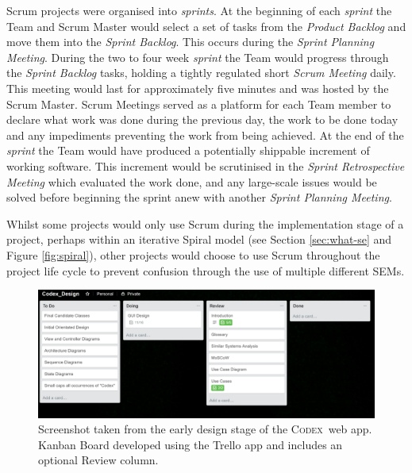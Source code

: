 \documentclass[final]{cmpreport}
\newcommand{\Codex}{\textsc{Codex}}
\begin{document}
			Scrum projects were organised into \emph{sprints}. At the beginning of each \emph{sprint} the Team and Scrum Master would select a set of tasks from the \emph{Product Backlog} and move them into the \emph{Sprint Backlog}. This occurs during the \emph{Sprint Planning Meeting}. During the two to four week \emph{sprint} the Team would progress through the \emph{Sprint Backlog} tasks, holding a tightly regulated short \emph{Scrum Meeting} daily. This meeting would last for approximately five minutes and was hosted by the Scrum Master. Scrum Meetings served as a platform for each Team member to declare what work was done during the previous day, the work to be done today and any impediments preventing the work from being achieved. At the end of the \emph{sprint} the Team would have produced a potentially shippable increment of working software. This increment would be scrutinised in the \emph{Sprint Retrospective Meeting} which evaluated the work done, and any large-scale issues would be solved before beginning the sprint anew with another \emph{Sprint Planning Meeting}.
			
			Whilst some projects would only use Scrum during the implementation stage of a project, perhaps within an iterative Spiral model (see Section \ref{sec:what-se} and Figure \ref{fig:spiral}), other projects would choose to use Scrum throughout the project life cycle to prevent confusion through the use of multiple different SEMs. 
			
			\begin{figure}
				\centering
				\includegraphics[width=0.8\linewidth]{trello_board.png}
				\caption[Example Kanban Board using Trello]{Screenshot taken from the early design stage of the \Codex \ web app. Kanban Board developed using the Trello app \citep{trello} and includes an optional Review column.} \label{fig:kanban}
			\end{figure}
		
\end{document}
